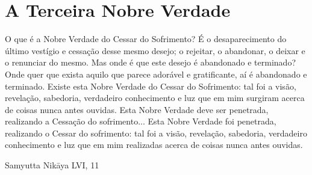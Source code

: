 \chapter{A Terceira Nobre Verdade}

O que é a Nobre Verdade do Cessar do
Sofrimento?
É o desaparecimento do último vestígio e cessação desse mesmo desejo; o rejeitar, o abandonar, o
deixar e o renunciar do mesmo. Mas onde é que este
desejo é abandonado e terminado? Onde quer que
exista aquilo que parece adorável e gratificante, aí
é abandonado e terminado.
Existe esta Nobre Verdade do Cessar do Sofrimento: tal foi a visão, revelação, sabedoria, verdadeiro conhecimento e luz que em mim surgiram
acerca de coisas nunca antes ouvidas.
Esta Nobre Verdade deve ser penetrada, realizando a Cessação do sofrimento...
Esta Nobre Verdade foi penetrada, realizando o
Cessar do sofrimento: tal foi a visão, revelação,
sabedoria, verdadeiro conhecimento e luz que em
mim realizadas acerca de coisas nunca antes ouvidas.

Samyutta Nikāya LVI, 11

